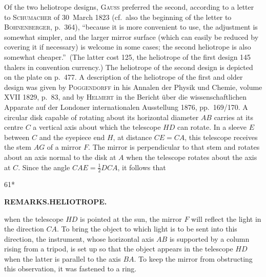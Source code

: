 Of the two heliotrope designs, \textsc{Gauss} preferred the second, according to a letter to \textsc{Schumacher}
of 30~March 1823 (cf.\ also the beginning of the letter to \textsc{Bohnenberger}, p.~364), ``because
it is more convenient to use, the adjustment is somewhat simpler, and the larger mirror surface (which can
easily be reduced by covering it if necessary) is welcome in some cases; the second heliotrope is also
somewhat cheaper.''\ (The latter cost 125, the heliotrope of the first design
145 thalers in convention currency.) The heliotrope of the second design is depicted on the plate on p.~477. A description of the heliotrope
of the first and older design was given by \textsc{Poggendorff} in his Annalen der Physik
und Chemie, volume XVII 1829, p.~83, and by \textsc{Helmert} in the Bericht über die wissenschaftlichen Apparate
auf der Londoner internationalen Ausstellung 1876, pp.~169/170. A circular disk capable of rotating about its
horizontal diameter $AB$ carries at its centre $C$ a vertical axis about
which the telescope $HD$ can rotate. In a sleeve $E$ between $C$ and the
eyepiece end $H$, at distance $CE=CA$, this telescope receives the stem $AG$
of a mirror $F$. The mirror is perpendicular to that stem and rotates about an axis
normal to the disk at $A$ when the telescope rotates about the axis at $C$.
Since the angle $CAE=\frac12 DCA$, it follows that
\par\endgroup
\begin{center}
\end{center}
\vfill\noindent\hfill61*

\clearpage
\noindent{}\hfill{\small\textbf{REMARKS.\quad HELIOTROPE.}}\hfill\null\par\medskip
\begingroup\small
\noindent when the telescope $HD$ is pointed at the sun, the mirror $F$ will reflect the light in the direction
$CA$. To bring the object to which light is to be sent into this direction, the instrument, whose horizontal
axis $AB$ is supported by a column rising from a tripod, is set up so that the object appears in the
telescope $HD$ when the latter is parallel to the axis $BA$.
To keep the mirror from obstructing this observation, it was fastened to a ring.


